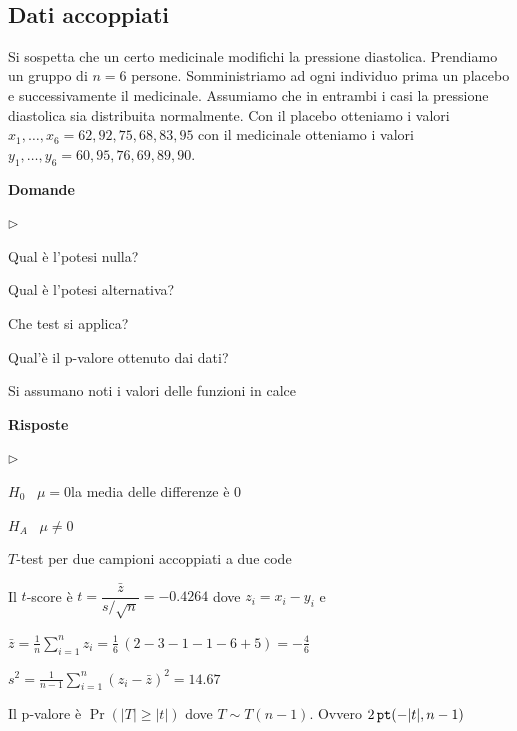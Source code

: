 \documentclass[11pt,openany]{book}
\newcommand{\mylabel}[1]{{\footnotesize\textsf{#1}}\hfill}
\renewenvironment{itemize}
  {\begin{list}{$\triangleright$}{%
   \setlength{\parskip}{0mm}
   \setlength{\topsep}{.2\baselineskip}
   \setlength{\rightmargin}{0mm}
   \setlength{\listparindent}{0mm}
   \setlength{\itemindent}{0mm}
   \setlength{\labelwidth}{3ex}
   \setlength{\itemsep}{.4\baselineskip}
   \setlength{\parsep}{0mm}
   \setlength{\partopsep}{0mm}
   \setlength{\labelsep}{1ex}
   \setlength{\leftmargin}{\labelwidth+\labelsep}
   \let\makelabel\mylabel}}{%
   \end{list}\vspace*{-1.3mm}}
\begin{document}
\clearpage\
\subsection{Dati accoppiati}

Si sospetta che un certo medicinale modifichi la pressione diastolica.  Prendiamo un gruppo di $n=6$ persone. Somministriamo ad ogni individuo prima un placebo e successivamente il medicinale. Assumiamo che in entrambi i casi la pressione diastolica sia distribuita normalmente. Con il placebo otteniamo i valori $x_1,\dots,x_6=62,92,75,68,83,95$ con il medicinale otteniamo i valori $y_1,\dots,y_6=60,95,76,69,89,90$.


\textbf{Domande}

\begin{itemize}
  \item[1.] Qual è l'potesi nulla?
  
  \item[2.] Qual è l'potesi alternativa?
  
  \item[3.] Che test si applica?
  
  \item[4.] Qual'è il p-valore ottenuto dai dati?
  \end{itemize}
  
  Si assumano noti i valori delle funzioni in calce
  
  \textbf{Risposte}

\begin{itemize}
\item[1.] $H_0$ \ $\mu = 0$\hfill la media delle differenze è $0$

\item[2.] $H_A$ \ $\mu\neq0$

\item[3.] $T$-test per due campioni accoppiati a due code

\item[4.] Il $t$-score è 
$t = \dfrac{\bar z}{s/\sqrt{n}}= -0.4264$ dove $z_i=x_i-y_i$ e

$\displaystyle\bar z = \frac1{n}\sum^n_{i=1}z_i=\frac16\,(2-3-1-1-6+5)=-\frac46$

$\displaystyle s^2= \frac1{n-1}\sum^n_{i=1}(z_i-\bar z)^2=14.67$

\item[4.] Il p-valore è $\Pr(|T|\ge |t|)$ dove $T\sim T(n-1)$.
Ovvero $2\,{\tt pt}(-|t|, n-1)$
\end{itemize}
\end{document}
